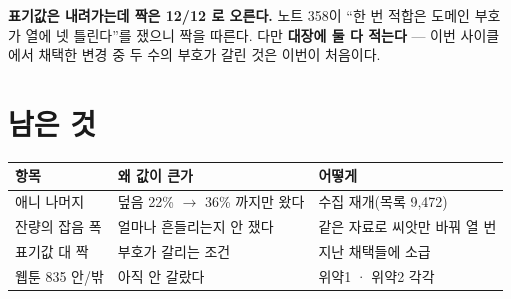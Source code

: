 \documentclass[11pt]{article}
\begin{document}
\textbf{표기값은 내려가는데 짝은 12/12 로 오른다.} 노트 358이 ``한 번
적합은 도메인 부호가 열에 넷 틀린다''를 쟀으니 짝을 따른다. 다만
\textbf{대장에 둘 다 적는다} --- 이번 사이클에서 채택한 변경 중 두 수의
부호가 갈린 것은 이번이 처음이다.

\section{남은 것}

\begin{center}
\begin{tabular}{lll}
\hline
항목 & 왜 값이 큰가 & 어떻게 \\
\hline
애니 나머지 & 덮음 22\% $\to$ 36\% 까지만 왔다 & 수집 재개(목록 9,472) \\
잔량의 잡음 폭 & 얼마나 흔들리는지 안 쟀다 & 같은 자료로 씨앗만 바꿔 열 번 \\
표기값 대 짝 & 부호가 갈리는 조건 & 지난 채택들에 소급 \\
웹툰 835 안/밖 & 아직 안 갈랐다 & 위약1 · 위약2 각각 \\
\hline
\end{tabular}
\end{center}
\end{document}
